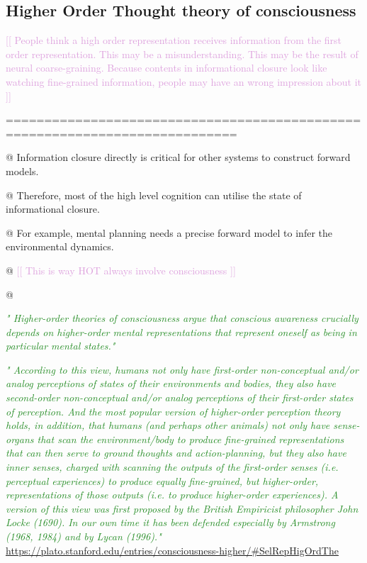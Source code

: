 \documentclass[utf8]{article}
\newenvironment{ants}
			{
			 \begin{easylist}[itemize]		
		 	}
			{
			\end{easylist}
			}
\newcommand{\rewrite}[1]{\textcolor{ForestGreen}{\textit{"#1"}}\newline}
\newcommand{\idea}[2][Plum]{\noindent
				\textcolor{#1}{[[ #2 ]]}}
\begin{document}
		
		

				
			
		\subsection{Higher Order Thought theory of consciousness}	
			\idea{
				People think a high order representation receives information from the first order representation. This may be a misunderstanding. This may be the result of neural coarse-graining. Because contents in informational closure look like watching fine-grained information, people may have an wrong impression about it}
		
			============================================================================			
			\begin{ants}
				@ Information closure directly is critical for other systems to construct forward models. 
				
				@ Therefore, most of the high level cognition can utilise the state of informational closure.
				
				@ For example, mental planning needs a precise forward model to infer the environmental dynamics. 
				
				@ \idea{This is way HOT always involve consciousness }
				
				@ \cite{rosenthal2005consciousness}
			\end{ants}
		
		
			\rewrite{
				Higher-order theories of consciousness argue that conscious awareness crucially depends on higher-order mental representations that represent oneself as being in particular mental states.} \cite{lau2011empirical}
		
		
			\rewrite{
				According to this view, humans not only have first-order non-conceptual and/or analog perceptions of states of their environments and bodies, they also have second-order non-conceptual and/or analog perceptions of their first-order states of perception. And the most popular version of higher-order perception theory holds, in addition, that humans (and perhaps other animals) not only have sense-organs that scan the environment/body to produce fine-grained representations that can then serve to ground thoughts and action-planning, but they also have inner senses, charged with scanning the outputs of the first-order senses (i.e. perceptual experiences) to produce equally fine-grained, but higher-order, representations of those outputs (i.e. to produce higher-order experiences). A version of this view was first proposed by the British Empiricist philosopher John Locke (1690). In our own time it has been defended especially by Armstrong (1968, 1984) and by Lycan (1996).} \url{https://plato.stanford.edu/entries/consciousness-higher/#SelRepHigOrdThe}
			
\end{document}

